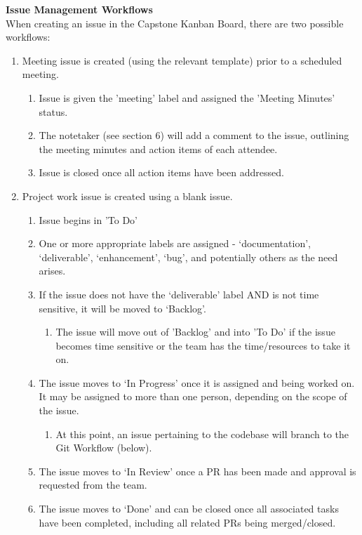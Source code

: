 \documentclass{article}
\begin{document}
\textbf{Issue Management Workflows}\\
When creating an issue in the Capstone Kanban Board, there are two possible workflows:
\begin{enumerate}
  \item Meeting issue is created (using the relevant template) prior to a scheduled meeting.  
  \begin{enumerate}
    \item Issue is given the 'meeting' label and assigned the 'Meeting Minutes' status.
    \item The notetaker (see section 6) will add a comment to the issue, outlining the meeting minutes and action items of each attendee.
    \item Issue is closed once all action items have been addressed.
  \end{enumerate}
  \item Project work issue is created using a blank issue.
  \begin{enumerate}
    \item Issue begins in 'To Do'
    \item One or more appropriate labels are assigned - ‘documentation’, ‘deliverable’, ‘enhancement’, ‘bug’, and potentially others as the need arises.
    \item If the issue does not have the ‘deliverable’ label AND is not time sensitive, it will be moved to ‘Backlog’.
    \begin{enumerate}
      \item The issue will move out of 'Backlog' and into 'To Do' if the issue becomes time sensitive or the team has the time/resources to take it on.
    \end{enumerate}
    \item The issue moves to ‘In Progress’ once it is assigned and being worked on. It may be assigned to more than one person, depending on the scope of the issue.
    \begin{enumerate}
      \item At this point, an issue pertaining to the codebase will branch to the Git Workflow (below).
    \end{enumerate}
    \item The issue moves to ‘In Review’ once a PR has been made and approval is requested from the team.
    \item The issue moves to ‘Done’ and can be closed once all associated tasks have been completed, including all related PRs being merged/closed.
  \end{enumerate}
\end{enumerate}
\end{document}

